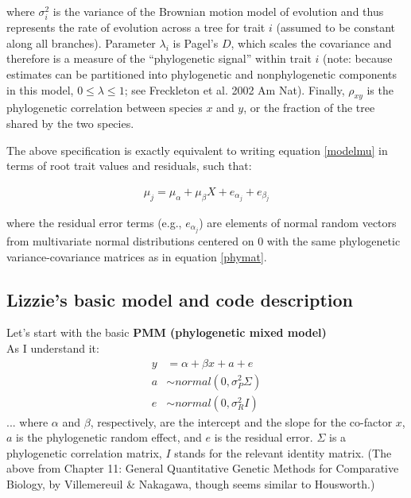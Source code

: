 \documentclass[12pt,a4paper]{article}
\begin{document}
\noindent where $\sigma_i^2$ is the variance of the Brownian motion model of evolution and thus represents the rate of evolution across a tree for trait $i$ (assumed to be constant along all branches). Parameter $\lambda_i$ is Pagel's $D$, which scales the covariance and therefore is a measure of the ``phylogenetic signal'' within trait $i$ (note: because estimates can be partitioned into phylogenetic and nonphylogenetic components in this model, $0 \leq \lambda \leq 1$; see Freckleton et al. 2002 Am Nat). Finally, $\rho_{xy}$ is the phylogenetic correlation between species $x$ and $y$, or the fraction of the tree shared by the two species.

The above specification is exactly equivalent to writing equation \ref{modelmu} in terms of root trait values and residuals, such that:

\begin{align}
  \mu_j = \mu_\alpha + \mu_{\beta} X + e_{\alpha_{j}} + e_{\beta{_j}}
\end{align}

\noindent where the residual error terms (e.g., $e_{\alpha_{j}}$) are elements of normal random vectors from multivariate normal distributions centered on $0$ with the same phylogenetic variance-covariance matrices as in equation \ref{phymat}.

\newpage
\subsection*{Lizzie's basic model and code description} %

Let's start with the basic {\bf PMM (phylogenetic mixed model)} \\

As I understand it:
\begin{align}
y & = \alpha + \beta x + a + e\\
a & \sim normal(0, \sigma_P^2\Sigma)\\
e & \sim normal(0, \sigma_R^2I)
\end{align}
... where $\alpha$ and $\beta$, respectively, are the intercept and the slope for the co-factor $x$, $a$ is the phylogenetic random effect, and $e$ is the residual error. $\Sigma$ is a phylogenetic correlation matrix, $I$ stands for the relevant identity matrix. (The above from Chapter 11: General Quantitative Genetic Methods for Comparative Biology, by Villemereuil \& Nakagawa, though seems similar to Housworth.)\\
\end{document}
